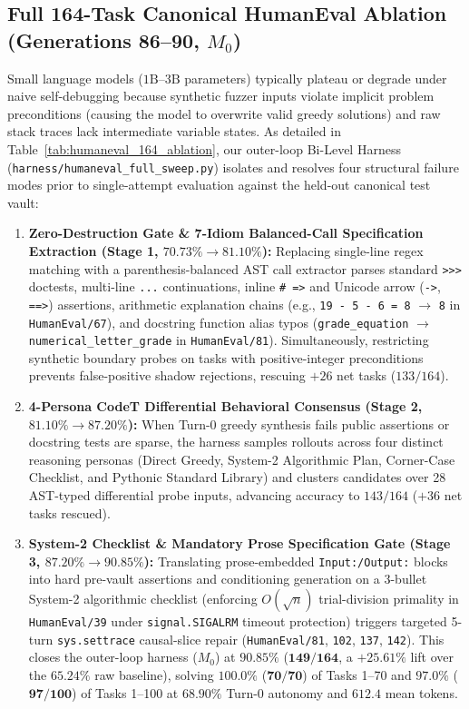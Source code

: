 \documentclass[10pt,twocolumn,letterpaper]{article}
\begin{document}
\subsection{Full 164-Task Canonical HumanEval Ablation (Generations 86--90, $M_{0}$)}
Small language models ($1\text{B}$--$3\text{B}$ parameters) typically plateau or degrade under naive self-debugging because synthetic fuzzer inputs violate implicit problem preconditions (causing the model to overwrite valid greedy solutions) and raw stack traces lack intermediate variable states. As detailed in Table~\ref{tab:humaneval_164_ablation}, our outer-loop Bi-Level Harness (\texttt{harness/\allowbreak humaneval\_\allowbreak full\_\allowbreak sweep.py}) isolates and resolves four structural failure modes prior to single-attempt evaluation against the held-out canonical test vault:
\begin{enumerate}
    \item \textbf{Zero-Destruction Gate \& 7-Idiom Balanced-Call Specification Extraction (Stage 1, $70.73\%\to 81.10\%$):} Replacing single-line regex matching with a parenthesis-balanced AST call extractor parses standard \texttt{>>>} doctests, multi-line \texttt{...} continuations, inline \texttt{\# =>} and Unicode arrow (\texttt{->}, \texttt{==>}) assertions, arithmetic explanation chains (e.g., \texttt{19 - 5 - 6 = 8} $\to$ \texttt{8} in \texttt{HumanEval/67}), and docstring function alias typos (\texttt{grade\_equation} $\to$ \texttt{numerical\_letter\_grade} in \texttt{HumanEval/81}). Simultaneously, restricting synthetic boundary probes on tasks with positive-integer preconditions prevents false-positive shadow rejections, rescuing $+26$ net tasks ($133/164$).
    \item \textbf{4-Persona CodeT Differential Behavioral Consensus (Stage 2, $81.10\%\to 87.20\%$):} When Turn-0 greedy synthesis fails public assertions or docstring tests are sparse, the harness samples rollouts across four distinct reasoning personas (Direct Greedy, System-2 Algorithmic Plan, Corner-Case Checklist, and Pythonic Standard Library) and clusters candidates over 28 AST-typed differential probe inputs, advancing accuracy to $143/164$ ($+36$ net tasks rescued).
    \item \textbf{System-2 Checklist \& Mandatory Prose Specification Gate (Stage 3, $87.20\%\to 90.85\%$):} Translating prose-embedded \texttt{Input:/Output:} blocks into hard pre-vault assertions and conditioning generation on a 3-bullet System-2 algorithmic checklist (enforcing $O(\sqrt{n})$ trial-division primality in \texttt{HumanEval/39} under \texttt{signal.SIGALRM} timeout protection) triggers targeted 5-turn \texttt{sys.settrace} causal-slice repair (\texttt{HumanEval/81}, \texttt{102}, \texttt{137}, \texttt{142}). This closes the outer-loop harness ($M_{0}$) at $\mathbf{90.85\%}$ ($\mathbf{149/164}$, a $\mathbf{+25.61\%}$ lift over the $65.24\%$ raw baseline), solving $\mathbf{100.0\%}$ ($\mathbf{70/70}$) of Tasks 1--70 and $\mathbf{97.0\%}$ ($\mathbf{97/100}$) of Tasks 1--100 at $68.90\%$ Turn-0 autonomy and $612.4$ mean tokens.
\end{enumerate}
\end{document}
